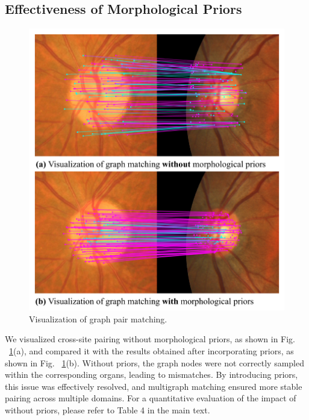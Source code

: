 \subsection{Effectiveness of Morphological Priors}
\begin{figure}[h]
    \centering
    \includegraphics[width=0.999\linewidth]{Figures/visual_pair.pdf}
    \caption{Visualization of graph pair matching.}
    \label{fig:re_visual}
\end{figure}
We visualized cross-site pairing without morphological priors, as shown in Fig. ~\ref{fig:re_visual}(a), and compared it with the results obtained after incorporating priors, as shown in Fig. ~\ref{fig:re_visual}(b). Without priors, the graph nodes were not correctly sampled within the corresponding organs, leading to mismatches. 
By introducing priors, this issue was effectively resolved, and multigraph matching ensured more stable pairing across multiple domains. For a quantitative evaluation of the impact of without priors, please refer to Table 4 in the main text.

